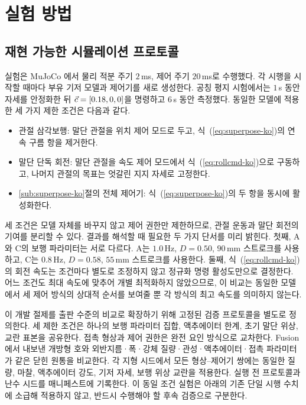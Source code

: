 \section{실험 방법}\label{sec:method-ko}

\subsection{재현 가능한 시뮬레이션 프로토콜}

실험은 MuJoCo \cite{todorov2012mujoco}에서 물리 적분 주기 $2\,$ms, 제어 주기
$20\,$ms로 수행했다. 각 시행을 시작할 때마다 부유 기저 모델과 제어기를 새로
생성한다. 공칭 평지 시험에서는 $1\,$s 동안 자세를 안정화한 뒤
$\vec{c}=[0.18,0,0]$을 명령하고 $6\,$s 동안 측정했다. 동일한 모델에 적용한 세
가지 제한 조건은 다음과 같다.
\begin{itemize}\itemsep2pt
 \item[A] 관절 삼각보행: 말단 관절을 위치 제어 모드로 두고,
 식~(\ref{eq:superpose-ko})의 연속 구름 항을 제거한다.
 \item[B] 말단 단독 회전: 말단 관절을 속도 제어 모드에서
 식~(\ref{eq:rollcmd-ko})으로 구동하고, 나머지 관절의 목표는 엇갈린 지지 자세로
 고정한다.
 \item[C] \ref{sub:superpose-ko}절의 전체 제어기: 식~(\ref{eq:superpose-ko})의
 두 항을 동시에 활성화한다.
\end{itemize}
세 조건은 모델 자체를 바꾸지 않고 제어 권한만 제한하므로, 관절 운동과 말단
회전의 기여를 분리할 수 있다. 결과를 해석할 때 필요한 두 가지 단서를 미리
밝힌다. 첫째, A와 C의 보행 파라미터는 서로 다르다. A는 $1.0\,$Hz,
$D=0.50$, $90\,$mm 스트로크를 사용하고, C는 $0.8\,$Hz, $D=0.58$,
$55\,$mm 스트로크를 사용한다. 둘째, 식~(\ref{eq:rollcmd-ko})의 회전 속도는
조건마다 별도로 조정하지 않고 정규화 명령 활성도만으로 결정한다. 어느 조건도
최대 속도에 맞추어 개별 최적화하지 않았으므로, 이 비교는 동일한 모델에서 세
제어 방식의 상대적 순서를 보여줄 뿐 각 방식의 최고 속도를 의미하지 않는다.

이 개발 절제를 출판 수준의 비교로 확장하기 위해 고정된 검증 프로토콜을 별도로
정의한다. 세 제한 조건은 하나의 보행 파라미터 집합, 액추에이터 한계, 초기 말단
위상, 교란 표본을 공유한다. 접촉 형상과 제어 권한은 완전 요인 방식으로 교차한다.
Fusion에서 내보낸 개방형 호와 외반지름·폭·강체 질량·관성·액추에이터·접촉
파라미터가 같은 닫힌 원통을 비교한다. 각 지형 시드에서 모든 형상--제어기 쌍에는
동일한 질량, 마찰, 액추에이터 강도, 기저 자세, 보행 위상 교란을 적용한다. 실행
전 프로토콜과 난수 시드를 매니페스트에 기록한다. 이 동일 조건 실험은 아래의 기존
단일 시행 수치에 소급해 적용하지 않고, 반드시 수행해야 할 후속 검증으로 구분한다.


